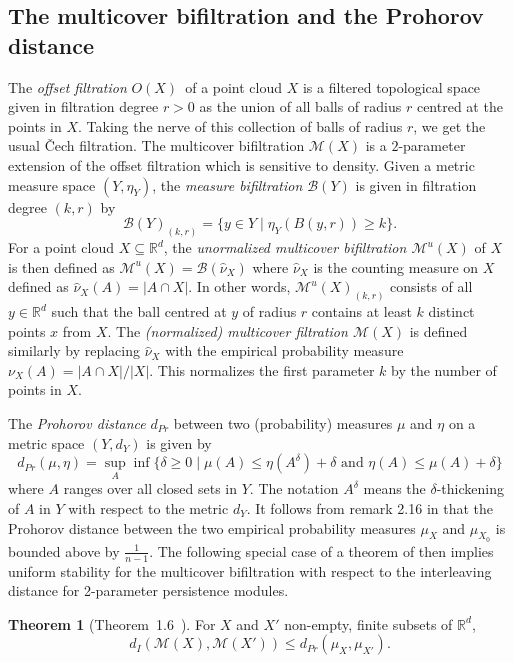 \documentclass[10pt,a4paper]{article}
\theoremstyle{definition}
\newtheorem{thm}{Theorem}[section]
\newcommand{\R}{\mathbb{R}}
\begin{document}
\subsection{The multicover bifiltration and the Prohorov distance}
The \textit{offset filtration} $O(X)$ of a point cloud $X$ is a filtered topological space given in filtration degree $r>0$ as the union of all balls of radius $r$ centred at the points in $X$. Taking the nerve of this collection of balls of radius $r$, we get the usual Čech filtration. The multicover bifiltration $\mathcal{M}(X)$ is a $2$-parameter extension of the offset filtration which is sensitive to density. Given a metric measure space $(Y,\eta_Y)$, the \textit{measure bifiltration $\mathcal{B}(Y)$} is given in filtration degree $(k,r)$ by $$\mathcal{B}(Y)_{(k,r)}=\{y\in Y\mid\eta_Y(B(y,r))\geq k\}.$$
For a point cloud $X\subseteq\R^d$, the \textit{unormalized multicover bifiltration $\mathcal{M}^u(X)$} of $X$ is then defined as $\mathcal{M}^u(X)=\mathcal{B}(\hat{\nu}_X)$ where $\hat{\nu}_X$ is the counting measure on $X$ defined as $\hat{\nu}_X(A)=|A\cap X|$. In other words, $\mathcal{M}^u(X)_{(k,r)}$ consists of all $y\in \R^d$ such that the ball centred at $y$ of radius $r$ contains at least $k$ distinct points $x$ from $X$. The \textit{(normalized) multicover filtration $\mathcal{M}(X)$} is defined similarly by replacing $\hat{\nu}_X$ with the empirical probability measure $\nu_X(A)=|A\cap X|/|X|$. This normalizes the first parameter $k$ by the number of points in $X$.


The \textit{Prohorov distance} $d_{Pr}$ between two (probability) measures $\mu$ and $\eta$ on a metric space $(Y,d_Y)$ is given by
$$
d_{Pr}(\mu, \eta) = \sup_A\inf\{\delta\geq0\mid\mu(A)\leq\eta(A^\delta)+\delta\text{ and } \eta(A)\leq\mu(A)+\delta\}
$$
where $A$ ranges over all closed sets in $Y$. The notation $A^\delta$ means the $\delta$-thickening of $A$ in $Y$ with respect to the metric $d_Y$. It follows from remark 2.16 in \cite{Blumberg2020} that the Prohorov distance between the two empirical probability measures $\mu_X$ and $\mu_{X_0}$ is bounded above by $\frac{1}{n-1}$. The following special case of a theorem of \cite{Blumberg2020} then implies uniform stability for the multicover bifiltration with respect to the interleaving distance for 2-parameter persistence modules.

\begin{thm}[Theorem~1.6~\cite{Blumberg2020}]
For $X$ and $X'$ non-empty, finite subsets of $\mathbb{R}^d$,
$$
d_I(\mathcal{M}(X), \mathcal{M}(X'))\leq d_{Pr}(\mu_X, \mu_{X'}).
$$
\end{thm}
\end{document}

